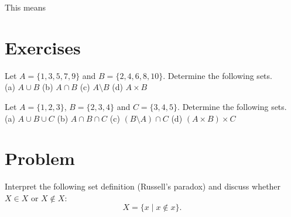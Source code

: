 This means 
\\


\section*{Exercises}


\begin{exercise}
  Let $A = \{1, 3, 5, 7, 9\}$ and $B = \{2, 4, 6, 8, 10\}$.
  Determine the following sets. \\
  (a) $A \cup B$ \quad
  (b) $A \cap B$ \quad
  (c) $A \setminus B$ \quad
  (d) $A \times B$
\end{exercise}

\begin{exercise}
  Let $A = \{1, 2, 3\}$, $B = \{2, 3, 4\}$ and $C = \{3, 4, 5\}$.
  Determine the following sets. \\
  (a) $A \cup B \cup C$ \quad
  (b) $A \cap B \cap C$ \quad
  (c) $(B \setminus A) \cap C$ \quad
  (d) $(A \times B) \times C$
\end{exercise}

\section*{Problem}

\begin{problem}
  Interpret the following set definition (Russell's paradox) and discuss
  whether $X \in X$ or $X \notin X$:
  \begin{equation}
    X = \{x \mid x \notin x\}.
  \end{equation}
\end{problem}

